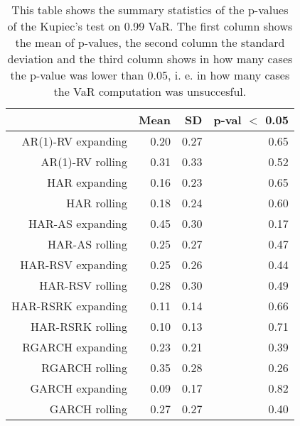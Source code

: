 \begin{table}[ht]
\centering
\begin{tabular}{rrrr}
  \hline
 & Mean & SD & p-val $<$ 0.05 \\ 
  \hline
AR(1)-RV expanding & 0.20 & 0.27 & 0.65 \\ 
  AR(1)-RV rolling & 0.31 & 0.33 & 0.52 \\ 
  HAR expanding & 0.16 & 0.23 & 0.65 \\ 
  HAR rolling & 0.18 & 0.24 & 0.60 \\ 
  HAR-AS expanding & 0.45 & 0.30 & 0.17 \\ 
  HAR-AS rolling & 0.25 & 0.27 & 0.47 \\ 
  HAR-RSV expanding & 0.25 & 0.26 & 0.44 \\ 
  HAR-RSV rolling & 0.28 & 0.30 & 0.49 \\ 
  HAR-RSRK expanding & 0.11 & 0.14 & 0.66 \\ 
  HAR-RSRK rolling & 0.10 & 0.13 & 0.71 \\ 
  RGARCH expanding & 0.23 & 0.21 & 0.39 \\ 
  RGARCH rolling & 0.35 & 0.28 & 0.26 \\ 
  GARCH expanding & 0.09 & 0.17 & 0.82 \\ 
  GARCH rolling & 0.27 & 0.27 & 0.40 \\ 
   \hline
\end{tabular}
\caption[Kupiec's test p-values summary, alpha =0.99]{This table shows the summary statistics of the p-values of the Kupiec's test on 0.99 VaR. 
            The first column shows the mean of p-values, the second column the standard deviation 
            and the third column shows in how many cases the p-value was lower than 0.05, i. e. in how many cases the VaR computation was unsuccesful.} 
\label{Table:Kupiec_test_summary_0.99}
\end{table}
